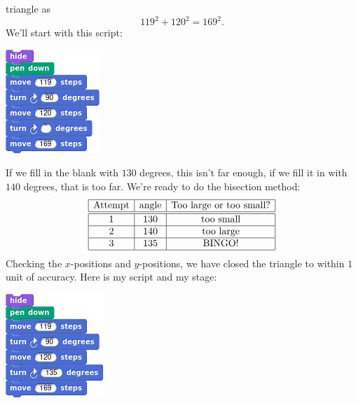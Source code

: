 \documentclass[noauthor,nooutcomes,handout]{ximera}
\begin{document}
\begin{question}
\begin{freeResponse}
\begin{description}
        triangle as
        \[
        119^2 + 120^2 =169^2.
        \]
        We'll start with this script:
        \begin{center}
          \includegraphics{basicScriptRightBlank.png}
        \end{center}
        If we fill in the blank with $130$ degrees, this isn't far
        enough, if we fill it in with $140$ degrees, that is too
        far. We're ready to do the bisection method:
        \[
        \begin{array}{|c|c|c|c|}\hline
          \text{Attempt} & \text{angle} & \text{Too large or too small?} \\ \hline\hline
          1 & 130 & \text{too small} \\ \hline
          2 & 140 & \text{too large}  \\ \hline
          3 & 135 & \text{BINGO!}  \\ \hline
        \end{array}
        \]
        Checking the $x$-positions and $y$-positions, we have closed
        the triangle to within $1$ unit of accuracy. Here is my script and my stage:
        \begin{center}
          \includegraphics[width=.3\textwidth]{119120169-script.png}   \qquad {}
        \end{center}






\end{description}
\end{freeResponse}
\end{question}
\end{document}
